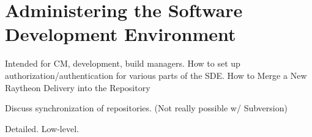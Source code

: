 
\section{Administering the Software Development Environment}

Intended for CM, development, build managers.  How to set up 
authorization/authentication for various parts of the SDE.
How to Merge a New Raytheon Delivery into the Repository

Discuss synchronization of repositories.  (Not really possible w/
Subversion)

Detailed.  Low-level.



